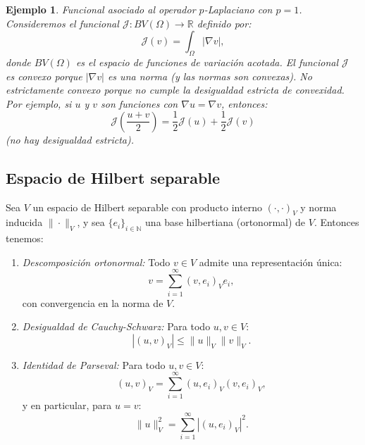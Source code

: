 \documentclass[12pt]{book}
\newtheorem{ex}{Ejemplo}
\theoremstyle{definition}
\theoremstyle{plain}
\theoremstyle{remark}
\begin{document}
\begin{ex}
Funcional asociado al operador \(p\)-Laplaciano con \(p = 1\).
Consideremos el funcional \(\mathcal{J}: BV(\Omega) \to \mathbb{R}\) definido por:
\[
\mathcal{J}(v) = \int_\Omega |\nabla v|,
\]
donde \(BV(\Omega)\) es el espacio de funciones de variación acotada.
El funcional \(\mathcal{J}\) es convexo porque \(|\nabla v|\) es una norma (y las normas son convexas).
No estrictamente convexo porque no cumple la desigualdad estricta de convexidad. Por ejemplo, si \(u\) y \(v\) son funciones con \(\nabla u = \nabla v\), entonces:
  \[
  \mathcal{J}\left(\frac{u + v}{2}\right) = \frac{1}{2} \mathcal{J}(u) + \frac{1}{2} \mathcal{J}(v)\] (no hay desigualdad estricta).
\end{ex}

\subsection{Espacio de Hilbert separable}

Sea \( V \) un espacio de Hilbert separable con producto interno \( (\cdot, \cdot)_V \) y norma inducida \( \|\cdot\|_V \), y sea \( \{e_i\}_{i \in \mathbb{N}} \) una {base hilbertiana} (ortonormal) de \( V \). Entonces tenemos:

\begin{enumerate}
    \item \emph{Descomposición ortonormal:}
    Todo \( v \in V \) admite una representación única:
    \[
    v = \sum_{i=1}^\infty (v, e_i)_V e_i,
    \]
    con convergencia en la norma de \( V \).

    \item \emph{Desigualdad de Cauchy-Schwarz:}
    Para todo \( u, v \in V \):
    \[
    |(u, v)_V| \leq \|u\|_V \|v\|_V.
    \]

    \item \emph{Identidad de Parseval:}
    Para todo \( u, v \in V \):
    \[
    (u, v)_V = \sum_{i=1}^\infty (u, e_i)_V {(v, e_i)_V},
    \]
    y en particular, para \( u = v \):
    \[
    \|u\|_V^2 = \sum_{i=1}^\infty |(u, e_i)_V|^2.
    \]

\end{enumerate}
\end{document}
